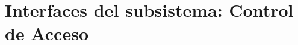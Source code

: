 \documentclass[10pt]{book}
\begin{document}
	\section{Interfaces del subsistema: Control de Acceso}
%	
\end{document}
